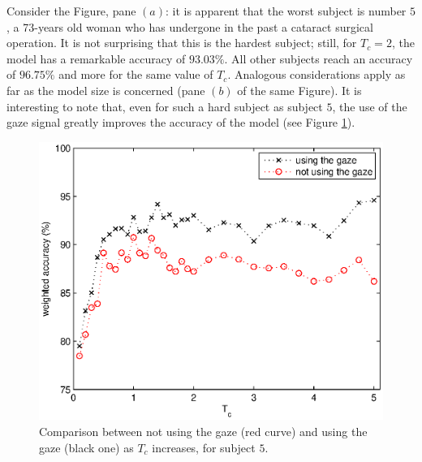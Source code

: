Consider the Figure, pane $(a)$: it is apparent that the worst subject
is number $5$, a 73-years old woman who has undergone in
the past a cataract surgical operation. It is not surprising that this
is the hardest subject; still, for $T_c=2$, the model has a remarkable
accuracy of $93.03\%$. All other subjects reach an accuracy of
$96.75\%$ and more for the same value of $T_c$. Analogous
considerations apply as far as the model size is concerned (pane $(b)$
of the same Figure). It is interesting to note that, even for such a
hard subject as subject $5$, the use of the gaze signal greatly
improves the accuracy of the model (see Figure \ref{fig:mama}).

\begin{figure}[!ht]
  \centering
    \includegraphics[width=\linewidth]{figs/mama.eps}
    \caption{Comparison between not using the gaze (red curve) and
    using the gaze (black one) as $T_c$ increases, for subject $5$.}
    \label{fig:mama}
\end{figure}
